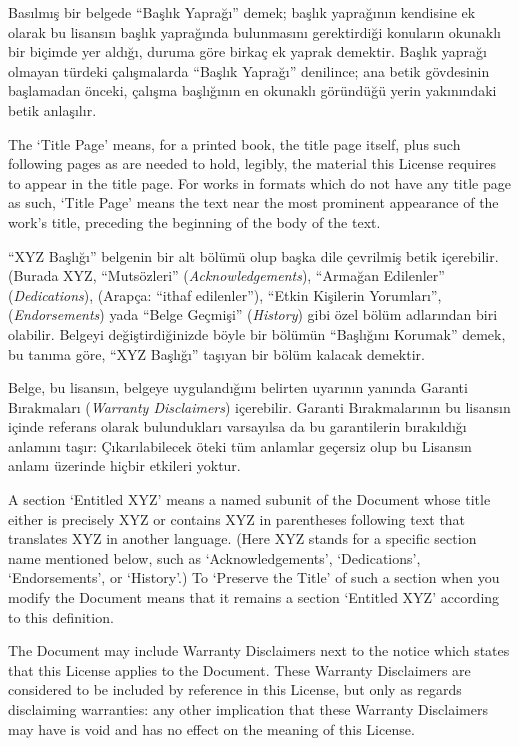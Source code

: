 \begin{multicols}{2}
\label{gfdl-title-page}%
Basılmış bir belgede “Başlık Yaprağı” demek; başlık yaprağının kendisine ek olarak bu lisansın başlık yaprağında bulunmasını gerektirdiği konuların okunaklı bir biçimde yer aldığı, duruma göre birkaç ek yaprak demektir. Başlık yaprağı olmayan türdeki çalışmalarda “Başlık Yaprağı” denilince; ana betik gövdesinin başlamadan önceki, çalışma başlığının en okunaklı göründüğü yerin yakınındaki betik anlaşılır.

\begin{ingliz}
The `Title Page' means, for a printed book, the title page itself, plus such following
pages as are needed to hold, legibly, the material this
License requires to appear in the title page. For works in
formats which do not have any title page as such, `Title Page'
means the text near the most prominent
appearance of the work's title, preceding the beginning
of the body of the text.
\end{ingliz}

\label{gfdl-entitled}%
“XYZ Başlığı” belgenin bir alt bölümü olup başka dile çevrilmiş betik içerebilir. (Burada XYZ, “Mutsözleri” (\emph{Acknowledgements}), “Armağan Edilenler” (\emph{Dedications}), (Arapça: ``ithaf edilenler''), “Etkin Kişilerin Yorumları”, (\emph{Endorsements}) yada “Belge Geçmişi” (\emph{History}) gibi özel bölüm adlarından biri olabilir. Belgeyi değiştirdiğinizde böyle bir bölümün “Başlığını Korumak” demek, bu tanıma göre, “XYZ Başlığı” taşıyan bir bölüm kalacak demektir.

Belge, bu lisansın, belgeye uygulandığını belirten uyarının yanında Garanti Bırakmaları (\emph{Warranty Disclaimers}) içerebilir. Garanti Bırakmalarının bu lisansın içinde referans olarak bulundukları varsayılsa da bu garantilerin bırakıldığı anlamını taşır: Çıkarılabilecek öteki tüm anlamlar geçersiz olup bu Lisansın anlamı üzerinde hiçbir etkileri yoktur.

\begin{ingliz}
A section `Entitled XYZ'
means a named subunit of the Document whose title either is
precisely XYZ or contains XYZ in parentheses following text
that translates XYZ in another language. (Here XYZ stands for
a specific section name mentioned below, such as
`Acknowledgements', `Dedications',
`Endorsements', or `History'.)  To
`Preserve the Title' of such a section when you
modify the Document means that it remains a section
`Entitled XYZ' according to this
definition.

The Document may include Warranty Disclaimers next to the
notice which states that this License applies to the Document.
These Warranty Disclaimers are considered to be included by
reference in this License, but only as regards disclaiming
warranties: any other implication that these Warranty
Disclaimers may have is void and has no effect on the meaning
of this License.
\end{ingliz}


\end{multicols}
